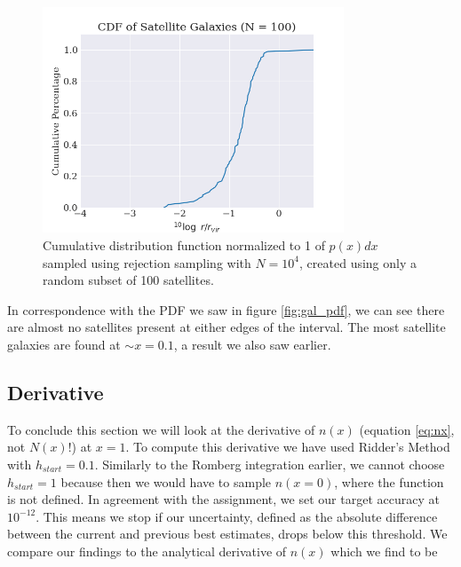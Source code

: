 \begin{figure}
    \centering
    \includegraphics[width=0.8\textwidth]{results/satellite_galaxies_cdf.png}
    \caption{Cumulative distribution function normalized to 1 of $p(x)dx$ sampled using rejection sampling with $N=10^4$, created using only a random subset of 100 satellites.}
    \label{fig:gal_cdf}
\end{figure}

In correspondence with the PDF we saw in figure \ref{fig:gal_pdf}, we can see there are almost no satellites present at either edges of the interval. The most satellite galaxies are found at $\sim x = 0.1$, a result we also saw earlier.




\subsection{Derivative}

To conclude this section we will look at the derivative of $n(x)$ (equation \ref{eq:nx}, not $N(x)$!) at $x=1$. To compute this derivative we have used Ridder's Method with $h_{start} = 0.1$. Similarly to the Romberg integration earlier, we cannot choose $h_{start} = 1$ because then we would have to sample $n(x=0)$, where the function is not defined. In agreement with the assignment, we set our target accuracy at $10^{-12}$. This means we stop if our uncertainty, defined as the absolute difference between the current and previous best estimates, drops below this threshold. We compare our findings to the analytical derivative of $n(x)$ which we find to be

